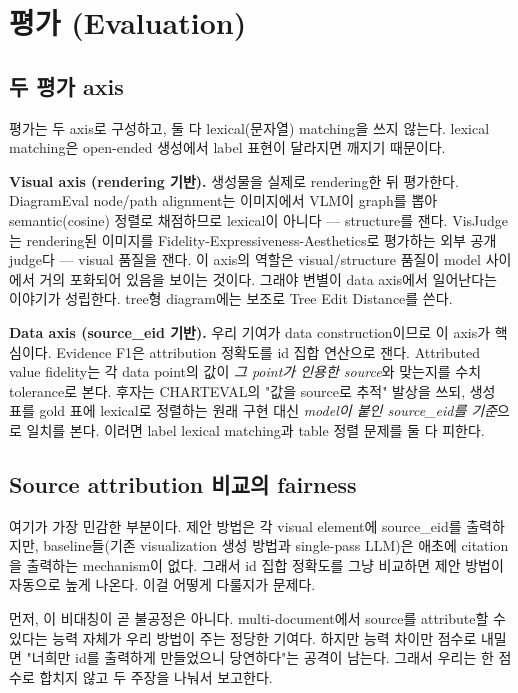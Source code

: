 \documentclass[11pt]{article}
\begin{document}
\section{평가 (Evaluation)}

\subsection{두 평가 axis}

평가는 두 axis로 구성하고, 둘 다 lexical(문자열) matching을 쓰지 않는다. lexical matching은
open-ended 생성에서 label 표현이 달라지면 깨지기 때문이다.

\textbf{Visual axis (rendering 기반).} 생성물을 실제로 rendering한 뒤 평가한다. DiagramEval
node/path alignment는 이미지에서 VLM이 graph를 뽑아 semantic(cosine) 정렬로 채점하므로 lexical이
아니다 — structure를 잰다. VisJudge는 rendering된 이미지를 Fidelity-Expressiveness-Aesthetics로
평가하는 외부 공개 judge다 — visual 품질을 잰다. 이 axis의 역할은 visual/structure 품질이 model
사이에서 거의 포화되어 있음을 보이는 것이다. 그래야 변별이 data axis에서 일어난다는 이야기가
성립한다. tree형 diagram에는 보조로 Tree Edit Distance를 쓴다.

\textbf{Data axis (source\_eid 기반).} 우리 기여가 data construction이므로 이 axis가 핵심이다.
Evidence F1은 attribution 정확도를 id 집합 연산으로 잰다. Attributed value fidelity는 각 data
point의 값이 \emph{그 point가 인용한 source}와 맞는지를 수치 tolerance로 본다. 후자는 CHARTEVAL의
"값을 source로 추적" 발상을 쓰되, 생성 표를 gold 표에 lexical로 정렬하는 원래 구현 대신
\emph{model이 붙인 source\_eid를 기준}으로 일치를 본다. 이러면 label lexical matching과 table
정렬 문제를 둘 다 피한다.

\subsection{Source attribution 비교의 fairness}

여기가 가장 민감한 부분이다. 제안 방법은 각 visual element에 source\_eid를 출력하지만,
baseline들(기존 visualization 생성 방법과 single-pass LLM)은 애초에 citation을 출력하는
mechanism이 없다. 그래서 id 집합 정확도를 그냥 비교하면 제안 방법이 자동으로 높게 나온다.
이걸 어떻게 다룰지가 문제다.

먼저, 이 비대칭이 곧 불공정은 아니다. multi-document에서 source를 attribute할 수 있다는 능력
자체가 우리 방법이 주는 정당한 기여다. 하지만 능력 차이만 점수로 내밀면 "너희만 id를 출력하게
만들었으니 당연하다"는 공격이 남는다. 그래서 우리는 한 점수로 합치지 않고 두 주장을 나눠서
보고한다.
\end{document}

